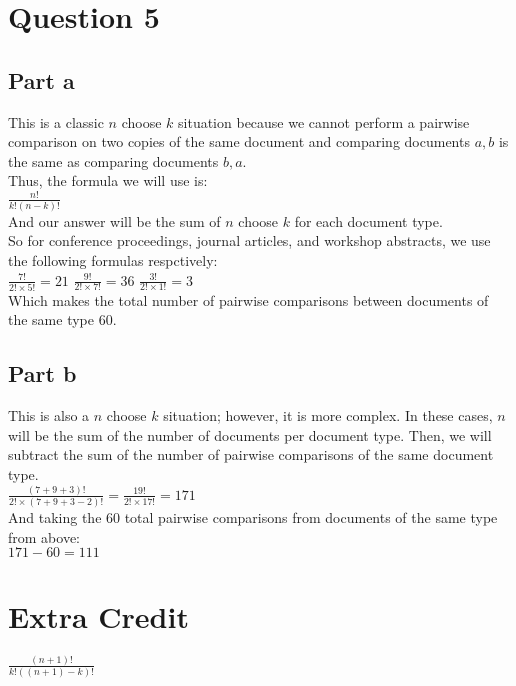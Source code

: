 \documentclass[10pt]{article}
\begin{document}
\section*{Question 5}

\subsection*{Part a}
\noindent
This is a classic $ n $ choose $ k $ situation because we cannot perform a pairwise comparison on two copies of the same document and comparing documents $ {a,b} $ is the same as comparing documents $ {b,a} $.\\
Thus, the formula we will use is:\\
$ \frac{n!}{k!(n-k)!} $\\
And our answer will be the sum of $ n $ choose $ k $ for each document type.\\
So for conference proceedings, journal articles, and workshop abstracts, we use the following formulas respctively:\\
$ \frac{7!}{2! \times 5!} = 21 $ $ \frac{9!}{2!\times 7!} = 36 $ $ \frac{3!}{2! \times 1!} = 3 $\\
Which makes the total number of pairwise comparisons between documents of the same type 60.

\subsection*{Part b}
This is also a $ n $ choose $ k $ situation; however, it is more complex. In these cases, $ n $ will be the sum of the number of documents per document type. Then, we will subtract the sum of the number of pairwise comparisons of the same document type.\\
$ \frac{(7 + 9 + 3)!}{2! \times (7 + 9 + 3 - 2)!} = \frac{19!}{2! \times 17!} = 171 $\\
And taking the 60 total pairwise comparisons from documents of the same type from above:\\
$ 171 - 60 = 111 $

\section*{Extra Credit}
\noindent
$ \frac{(n + 1)!}{k!((n + 1) - k)!}$
\end{document}
